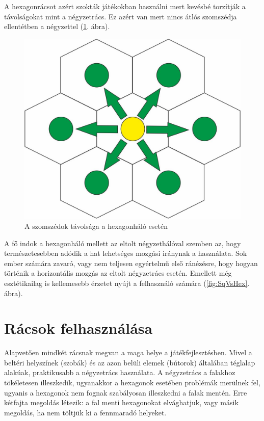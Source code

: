 A hexagonrácsot azért szokták játékokban használni mert kevésbé torzítják a távolságokat mint a négyzetrács. Ez azért van mert nincs átlós szomszédja ellentétben a négyzettel (\ref{fig:HexDistance}. ábra).

\begin{figure}[h!]
\centering
\includegraphics[scale=0.4]{kepek/HexDistance.jpg}
\caption{A szomszédok távolsága a hexagonháló esetén}
\label{fig:HexDistance}
\end{figure}

A fő indok a hexagonháló mellett az eltolt négyzethálóval szemben az, hogy természetesebben adódik a hat lehetséges mozgási iránynak a használata. Sok ember számára zavaró, vagy nem teljesen egyértelmű első ránézésre, hogy hogyan történik a horizontális mozgás az eltolt négyzetrács esetén. Emellett még esztétikailag is kellemesebb érzetet nyújt a felhasználó számára (\ref{fig:SqVsHex}. ábra).
\newpage
\section{Rácsok felhasználása}

Alapvetően mindkét rácsnak megvan a maga helye a játékfejlesztésben.  Mivel a beltéri helyszínek (szobák) és az azon belüli elemek (bútorok) általában téglalap alakúak, praktikusabb a négyzetrács használata. A négyzetrács a falakhoz tökéletesen illeszkedik, ugyanakkor a hexagonok esetében problémák merülnek fel, ugyanis a hexagonok nem fognak szabályosan illeszkedni a falak mentén. Erre kétfajta megoldás létezik: a fal menti hexagonokat elvághatjuk, vagy másik megoldás, ha nem töltjük ki a fennmaradó helyeket.

